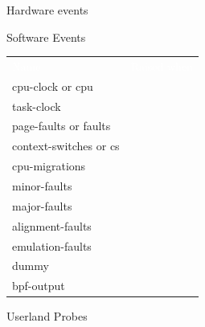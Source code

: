 \begin{reveals}
\begin{frame}[c,fragile]{Hardware events}
\end{frame}



\begin{frame}[c,fragile]{Software Events}
  \begin{center}
      \color{deepblue}
    \begin{tabular}{|p{}p{}|}
      \arrayrulecolor{deepblue}
          {\cellcolor{deepblue}\textcolor{white}{Name}} &
                                                          {\cellcolor{deepblue}\textcolor{white}{Raised when}} \\
    cpu-clock or cpu& \\
    task-clock& \\
    page-faults or faults& \\
    context-switches or cs& \\
    cpu-migrations& \\
    minor-faults& \\
    major-faults& \\
    alignment-faults& \\
    emulation-faults& \\
    dummy& \\
    bpf-output& \\\hline
    \end{tabular}
  \end{center}
\end{frame}






\begin{frame}[c,fragile]{Userland Probes}
  

\end{frame}
\end{reveals}
